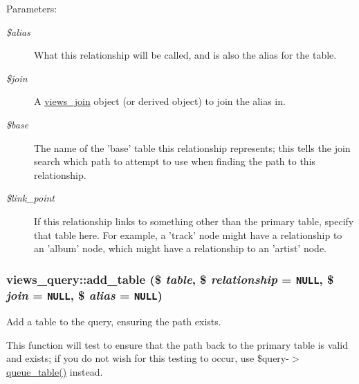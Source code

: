 \begin{Desc}
\item[Parameters:]
\begin{description}
\item[{\em \$alias}]What this relationship will be called, and is also the alias for the table. \item[{\em \$join}]A \hyperlink{classviews__join}{views\_\-join} object (or derived object) to join the alias in. \item[{\em \$base}]The name of the 'base' table this relationship represents; this tells the join search which path to attempt to use when finding the path to this relationship. \item[{\em \$link\_\-point}]If this relationship links to something other than the primary table, specify that table here. For example, a 'track' node might have a relationship to an 'album' node, which might have a relationship to an 'artist' node. \end{description}
\end{Desc}
\hypertarget{classviews__query_52cdfc5396008424c4c232cca1a8f8bb}{
\subsubsection[{add\_\-table}]{\setlength{\rightskip}{0pt plus 5cm}views\_\-query::add\_\-table (\$ {\em table}, \/  \$ {\em relationship} = {\tt NULL}, \/  \$ {\em join} = {\tt NULL}, \/  \$ {\em alias} = {\tt NULL})}}
\label{classviews__query_52cdfc5396008424c4c232cca1a8f8bb}


Add a table to the query, ensuring the path exists.

This function will test to ensure that the path back to the primary table is valid and exists; if you do not wish for this testing to occur, use \$query-$>$\hyperlink{classviews__query_0ed3905be8cddfdbde96a39569686bcb}{queue\_\-table()} instead.

